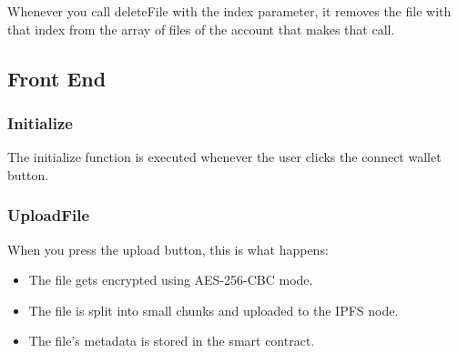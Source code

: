Whenever you call deleteFile with the index parameter, it removes the file with that index from the array of files of the account that makes that call.


\subsection{Front End}


\subsubsection{Initialize}

The initialize function is executed whenever the user clicks the connect wallet button.


\subsubsection{UploadFile}

When you press the upload button, this is what happens: \\
\begin{itemize}
\item The file gets encrypted using AES-256-CBC mode.
\item The file is split into small chunks and uploaded to the IPFS node.
\item The file's metadata is stored in the smart contract.
\end{itemize}


